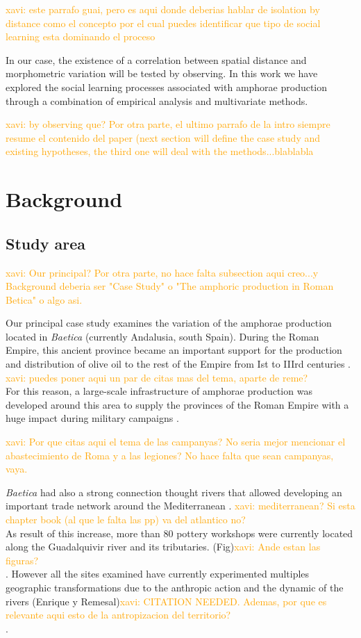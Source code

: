 \documentclass[review]{elsarticle}
\newcommand{\memo}[2]{\textcolor{#1}{#2}}
\newcommand{\xavi}[1]{\memo{orange}{xavi: #1\\}}
\begin{document}
\xavi{este parrafo guai, pero es aqui donde deberias hablar de isolation by distance como el concepto por el cual puedes identificar que tipo de social learning esta dominando el proceso}

In our case, the existence of a correlation between spatial distance and morphometric variation will be tested by observing. In this work we have explored the social learning processes associated with amphorae production through a combination of empirical analysis and multivariate methods. 

\xavi{by observing que? Por otra parte, el ultimo parrafo de la intro siempre resume el contenido del paper (next section will define the case study and existing hypotheses, the third one will deal with the methods...blablabla}

\section{Background}

\subsection{Study area}

\xavi{Our principal? Por otra parte, no hace falta subsection aqui creo...y Background deberia ser "Case Study" o "The amphoric production in Roman Betica" o algo asi.}

Our principal case study examines the variation of the amphorae production located in \emph{Baetica} (currently Andalusia, south Spain). During the Roman Empire, this ancient province became an important support for the production and distribution of olive oil to the rest of the Empire from Ist to IIIrd centuries \cite{rodriguez_baetican_1998}. \xavi{puedes poner aqui un par de citas mas del tema, aparte de reme?} For this reason, a large-scale infrastructure of amphorae production was developed around this area to supply the provinces of the Roman Empire with a huge impact during military campaigns \citep{monfort_britannia_1998}. 

\xavi{Por que citas aqui el tema de las campanyas? No seria mejor mencionar el abastecimiento de Roma y a las legiones? No hace falta que sean campanyas, vaya.}

\emph{Baetica} had also a strong connection thought rivers that allowed developing an important trade network around the Mediterranean \citep{garcia_vargas_enrique_formal_2010}. \xavi{mediterranean? Si esta chapter book (al que le falta las pp) va del atlantico no?}As result of this increase, more than 80 pottery workshops were currently located along the Guadalquivir river and its tributaries. (Fig)\xavi{Ande estan las figuras?}. However all the sites examined have currently experimented multiples geographic transformations due to the anthropic action and the dynamic of the rivers (Enrique y Remesal)\xavi{CITATION NEEDED. Ademas, por que es relevante aqui esto de la antropizacion del territorio?}. 
\end{document}
